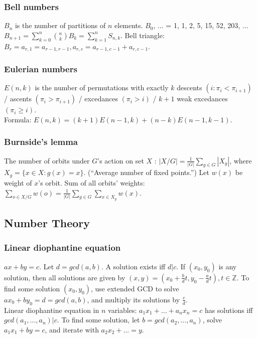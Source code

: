 \documentclass[a4paper,12pt]{article}
\begin{document}
\subsubsection{Bell numbers}
$B_{n}$ is the number of partitions of $n$ elements. $B_0$, ... = 1, 1, 2, 5, 15, 52, 203, ...\\
$B_{n+1} = \sum_{k=0}^{n}\binom{n}{k}B_{k} = \sum_{k=1}^{n} S_{n,k}$. Bell triangle: $B_r = a_{r,1} = a_{r-1,r-1}, a_{r,c} = a_{r-1,c-1} + a_{r,c-1}$.

\subsubsection{Eulerian numbers}
$E(n, k)$ is the number of permutations with exactly $k$ descents $(i : \pi_{i} < \pi_{i+1})$ / ascents $(\pi_{i} > \pi_{i+1})$ / excedances $(\pi_{i} > i)$ / $k + 1$ weak excedances $(\pi_{i} \geq i)$.\\
Formula: $E(n,k) = (k+1)E(n-1,k) + (n-k)E(n-1,k-1)$.

\subsubsection{Burnside's lemma}
The number of orbits under $G$'s action on set $X$ : $|X/G| = \frac{1}{|G|} \sum_{g \in G} |X_g|$, where $X_g = \{x \in X : g(x) = x\}$. (``Average number of fixed points.'')
Let $w(x)$ be weight of $x$'s orbit. Sum of all orbits' weights: $\sum_{o \in X/G}w(o) = \frac{1}{|G|} \sum_{g \in G} \sum_{x \in X_g} w(x)$.

\subsection{Number Theory}
\subsubsection{Linear diophantine equation}
$ax + by = c$. Let $d = gcd(a,b)$. A solution exists iff $d|c$. If $(x_0, y_0)$ is any solution, then all solutions are given by $(x, y) = (x_0 + \frac{b}{d}t, y_0 - \frac{a}{d}t), t \in \mathbb{Z}$. To find some solution $(x_0, y_0)$,
use extended GCD to solve $ax_0 + by_0 = d = gcd(a, b)$, and multiply its solutions by $\frac{c}{d}$.\\
Linear diophantine equation in $n$ variables: $a_1x_1 + ... + a_nx_n = c$ has solutions iff $gcd(a_1, ..., a_n) | c$. To find some solution, let $b = gcd(a_2, ..., a_n)$, solve $a_1x_1 + by = c$, and iterate with $a_2x_2 + ... = y$.
\end{document}
